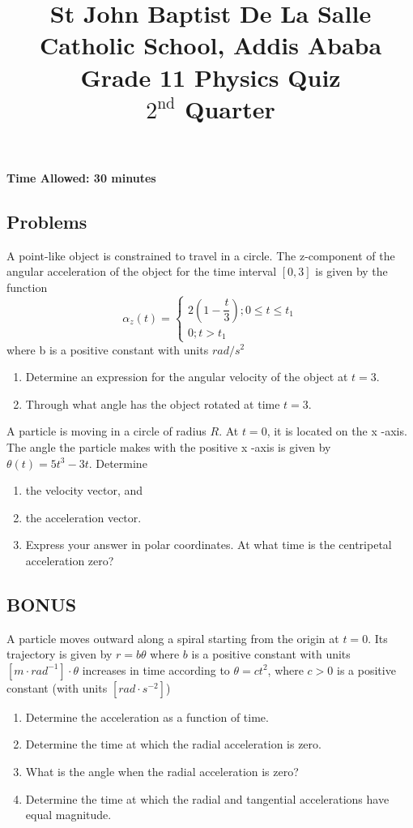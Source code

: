 \documentclass[12pt,addpoints]{exam}
\begin{document}
	\title{St John Baptist De La Salle Catholic School, Addis Ababa\\
		\large Grade 11 Physics Quiz\\
		$2^\text{nd}$ Quarter}
	\maketitle
	\textbf{Time Allowed: 30 minutes}
	\begin{questions}
		\subsection*{Problems}
		\question[2] A point-like object is constrained to travel in a circle. The z-component of the angular acceleration of the object for the time interval $[0,3]$ is given by the function
		$$\alpha_{z}(t)=\left\{\begin{array}{l} 
			2\left(1-\dfrac{t}{3}\right) ; 0 \leq t \leq t_{1} \\ 
			0 ; t>t_{1} 
		\end{array}\right. \nonumber$$
		where b is a positive constant with units $rad/s^2$
		\begin{enumerate}[label=(\alph*)]
			\item Determine an expression for the angular velocity of the object at $t=3$.
			\item Through what angle has the object rotated at time $t=3$.  
		\end{enumerate}
		\question[3] A particle is moving in a circle of radius $R$. At $t = 0$, it is located on the x -axis. The angle the particle makes with the positive x -axis is given by  $\theta(t)=5t^3-3t$. 
		Determine \begin{enumerate}[label=(\alph*)]
			\item the velocity vector, and 
			\item the acceleration vector. 
			\item Express your answer in polar coordinates. At what time is the centripetal acceleration zero? 
		\end{enumerate}
		\subsection*{BONUS}
		\question[1] A particle moves outward along a spiral starting from the origin at $t = 0$. Its trajectory is given by  $r=b\theta$ where $b$ is a positive constant with units  $[m\cdot rad^{-1}]\cdot\theta$
		increases in time according to  $\theta=ct^2$, where $c>0$ is a positive constant (with units  $[rad\cdot s^{-2}]$)
		\begin{enumerate}[label=(\alph*)]
			\item Determine the acceleration as a function of time.
			\item Determine the time at which the radial acceleration is zero.
			\item What is the angle when the radial acceleration is zero?
			\item Determine the time at which the radial and tangential accelerations have equal magnitude.
		\end{enumerate}
	\end{questions}
\end{document}
